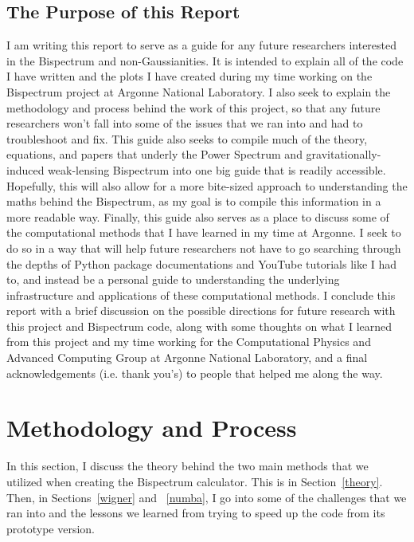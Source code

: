\documentclass[11pt]{article}
\renewcommand{\_}[1]{\underline{ #1 }}
\begin{document}
{\subsection{The Purpose of this Report}

I am writing this report to serve as a guide for any future researchers interested in the Bispectrum and non-Gaussianities. It is intended to explain all of the code I have written and the plots I have created during my time working on the Bispectrum project at Argonne National Laboratory. I also seek to explain the methodology and process behind the work of this project, so that any future researchers won't fall into some of the issues that we ran into and had to troubleshoot and fix. This guide also seeks to compile much of the theory, equations, and papers that underly the Power Spectrum and gravitationally-induced weak-lensing Bispectrum into one big guide that is readily accessible. Hopefully, this will also allow for a more bite-sized approach to understanding the maths behind the Bispectrum, as my goal is to compile this information in a more readable way. Finally, this guide also serves as a place to discuss some of the computational methods that I have learned in my time at Argonne. I seek to do so in a way that will help future researchers not have to go searching through the depths of Python package documentations and YouTube tutorials like I had to, and instead be a personal guide to understanding the underlying infrastructure and applications of these computational methods. I conclude this report with a brief discussion on the possible directions for future research with this project and Bispectrum code, along with some thoughts on what I learned from this project and my time working for the Computational Physics and Advanced Computing Group at Argonne National Laboratory, and a final acknowledgements (i.e. thank you's) to people that helped me along the way.

\section{Methodology and Process}\label{methodology}

In this section, I discuss the theory behind the two main methods that we utilized when creating the Bispectrum calculator. This is in Section~\ref{theory}. Then, in Sections~\ref{wigner} and ~\ref{numba}, I go into some of the challenges that we ran into and the lessons we learned from trying to speed up the code from its prototype version.

}
\end{document}

